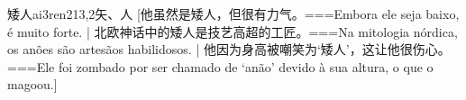 \begin{EntryWithPhonetic}{矮人}{ai3ren2}{13,2}{⽮、⼈}
  [他虽然是矮人，但很有力气。===Embora ele seja baixo, é muito forte. | 北欧神话中的矮人是技艺高超的工匠。===Na mitologia nórdica, os anões são artesãos habilidosos. | 他因为身高被嘲笑为‘矮人’，这让他很伤心。===Ele foi zombado por ser chamado de ‘anão’ devido à sua altura, o que o magoou.]
\end{EntryWithPhonetic}
